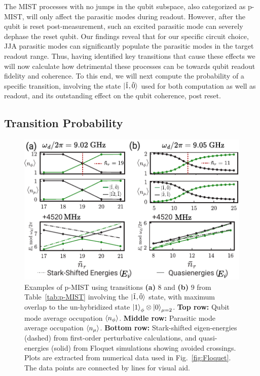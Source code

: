 \documentclass[%
reprint,
superscriptaddress,
 amsmath,amssymb,
 aps,
 prx,
longbibliography,
floatfix,
]{revtex4-2}
\begin{document}
The MIST processes with no jumps in the qubit subspace, also categorized as p-MIST, will only affect the parasitic modes during readout. However, after the qubit is reset post-measurement, such an excited parasitic mode can severely dephase the reset qubit. Our findings reveal that for our specific circuit choice, JJA parasitic modes can significantly populate the parasitic modes in the target readout range. Thus, having identified key transitions that cause these effects we will now calculate how detrimental these processes can be towards qubit readout fidelity and coherence. To this end, we will next compute the probability of a specific transition, involving the state $\ket{\tilde{1},\tilde{0}}$ used for both computation as well as readout, and its outstanding effect on the qubit coherence, post reset.

\subsection{Transition Probability}\label{sec:LZ}
 \begin{figure}[htb]
    \centering
    \includegraphics[width=\linewidth]{Figures/Floquet_011.pdf}
    \caption{Examples of p-MIST using transitions \textbf{(a)} $8$ and \textbf{(b)} $9$ from Table~\ref{tab:p-MIST} involving the $\ket{\tilde{1},\tilde{0}}$ state, with maximum overlap to the un-hybridized state $\ket{1}_\phi\otimes\ket{0}_{\mu=2}$. \textbf{Top row:} Qubit mode average occupation $\braket{n_\phi}$. \textbf{Middle row:} Parasitic mode average occupation $\braket{n_\mu}$. \textbf{Bottom row:} Stark-shifted eigen-energies (dashed) from first-order perturbative calculations, and quasi-energies (solid) from Floquet simulations showing avoided crossings. Plots are extracted from numerical data used in Fig.~\ref{fig:Floquet}. The data points are connected by lines for visual aid.}
    \label{fig:011}
\end{figure}
\end{document}
